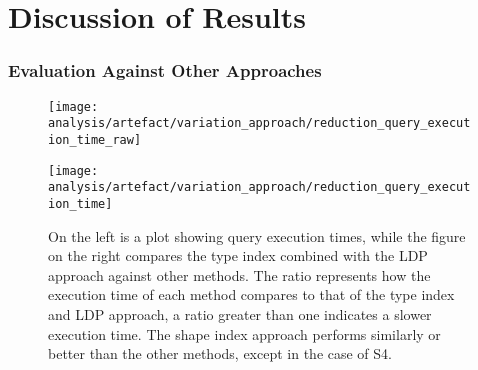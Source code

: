 \section{Discussion of Results}\label{sec:result}

\subsubsection{Evaluation Against Other Approaches}

\begin{figure}
    \centering
    \begin{minipage}[t]{0.40\linewidth}
        \centering
        \texttt{[image: analysis/artefact/variation\_approach/reduction\_query\_execution\_time\_raw]}
    \end{minipage}
    \hspace{0.05\textwidth}
    \begin{minipage}[t]{0.40\linewidth}
        \centering
        \texttt{[image: analysis/artefact/variation\_approach/reduction\_query\_execution\_time]}
    \end{minipage}

    \caption{
    On the left is a plot showing query execution times, while the figure on the right compares the type index combined with the LDP approach against other methods.
    The ratio represents how the execution time of each method compares to that of the type index and LDP approach, a ratio greater than one indicates a slower execution time.
    The shape index approach performs similarly or better than the other methods, except in the case of S4.
    }
    \label{fig:compApproach}
\end{figure}

%


